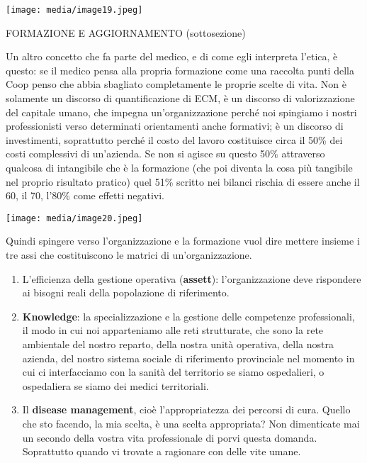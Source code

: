 \documentclass[]{article}
\begin{document}
\texttt{[image: media/image19.jpeg]}

FORMAZIONE E AGGIORNAMENTO (sottosezione)

Un altro concetto che fa parte del medico, e di come egli interpreta
l'etica, è questo: se il medico pensa alla propria formazione come una
raccolta punti della Coop penso che abbia sbagliato completamente le
proprie scelte di vita. Non è solamente un discorso di quantificazione
di ECM, è un discorso di valorizzazione del capitale umano, che impegna
un'organizzazione perché noi spingiamo i nostri professionisti verso
determinati orientamenti anche formativi; è un discorso di investimenti,
soprattutto perché il costo del lavoro costituisce circa il 50\% dei
costi complessivi di un'azienda. Se non si agisce su questo 50\%
attraverso qualcosa di intangibile che è la formazione (che poi diventa
la cosa più tangibile nel proprio risultato pratico) quel 51\% scritto
nei bilanci rischia di essere anche il 60, il 70, l'80\% come effetti
negativi.

\texttt{[image: media/image20.jpeg]}

Quindi spingere verso l'organizzazione e la formazione vuol dire mettere
insieme i tre assi che costituiscono le matrici di un'organizzazione.

\begin{enumerate}
\def\labelenumi{\arabic{enumi}.}
\item
  L'efficienza della gestione operativa (\textbf{assett}):
  l'organizzazione deve rispondere ai bisogni reali della popolazione di
  riferimento.
\item
  \textbf{Knowledge}: la specializzazione e la gestione delle competenze
  professionali, il modo in cui noi apparteniamo alle reti strutturate,
  che sono la rete ambientale del nostro reparto, della nostra unità
  operativa, della nostra azienda, del nostro sistema sociale di
  riferimento provinciale nel momento in cui ci interfacciamo con la
  sanità del territorio se siamo ospedalieri, o ospedaliera se siamo dei
  medici territoriali.
\item
  Il \textbf{disease management}, cioè l'appropriatezza dei percorsi di
  cura. Quello che sto facendo, la mia scelta, è una scelta appropriata?
  Non dimenticate mai un secondo della vostra vita professionale di
  porvi questa domanda. Soprattutto quando vi trovate a ragionare con
  delle vite umane.
\end{enumerate}
\end{document}
